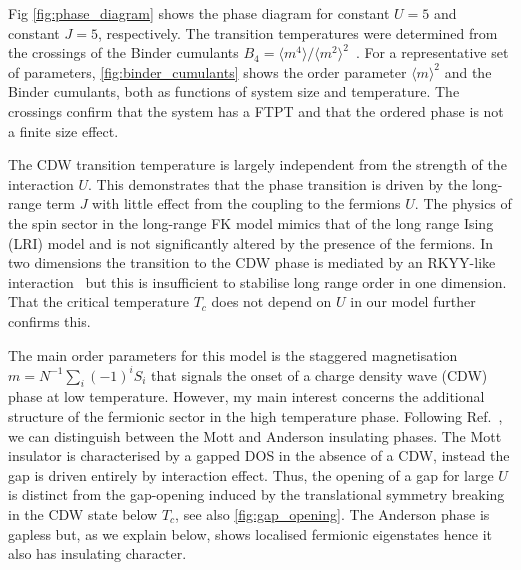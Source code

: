 Fig \cref{fig:phase_diagram} shows the phase diagram for constant \(U=5\) and constant \(J=5\), respectively. The transition temperatures were determined from the crossings of the Binder cumulants \(B_4 = \langle m^4 \rangle /\langle m^2 \rangle^2\)~\autocite{binderFiniteSizeScaling1981}. For a representative set of parameters, \cref{fig:binder_cumulants} shows the order parameter \(\langle m \rangle^2\) and the Binder cumulants, both as functions of system size and temperature. The crossings confirm that the system has a FTPT and that the ordered phase is not a finite size effect.

The CDW transition temperature is largely independent from the strength of the interaction \(U\). This demonstrates that the phase transition is driven by the long-range term \(J\) with little effect from the coupling to the fermions \(U\). The physics of the spin sector in the long-range FK model mimics that of the long range Ising (LRI) model and is not significantly altered by the presence of the fermions. In two dimensions the transition to the CDW phase is mediated by an RKYY-like interaction~\autocite{rusinCalculationRKKYRange2017} but this is insufficient to stabilise long range order in one dimension. That the critical temperature \(T_c\) does not depend on \(U\) in our model further confirms this.

The main order parameters for this model is the staggered magnetisation \(m = N^{-1} \sum_i (-1)^i S_i\) that signals the onset of a charge density wave (CDW) phase at low temperature. However, my main interest concerns the additional structure of the fermionic sector in the high temperature phase. Following Ref.~\autocite{antipovInteractionTunedAndersonMott2016}, we can distinguish between the Mott and Anderson insulating phases. The Mott insulator is characterised by a gapped DOS in the absence of a CDW, instead the gap is driven entirely by interaction effect. Thus, the opening of a gap for large \(U\) is distinct from the gap-opening induced by the translational symmetry breaking in the CDW state below \(T_c\), see also \cref{fig:gap_opening}. The Anderson phase is gapless but, as we explain below, shows localised fermionic eigenstates hence it also has insulating character.

